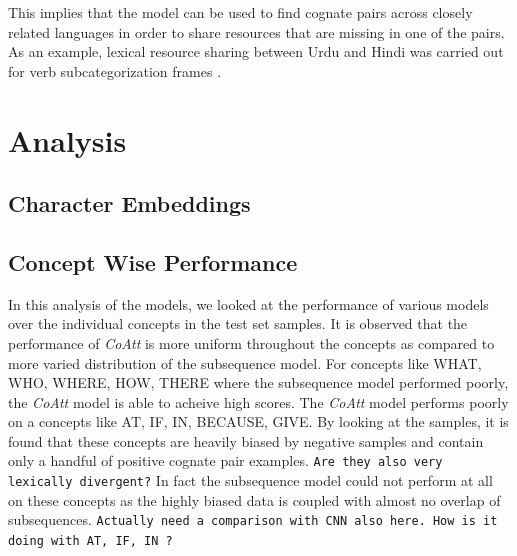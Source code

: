 \documentclass[11pt,letterpaper]{article}
\begin{document}
This implies that the model can be used to find cognate pairs across closely related languages in order to share resources that are missing in one of the pairs. As an example, lexical resource sharing between Urdu and Hindi was carried out for verb subcategorization frames \cite{bhat-EtAl:2014:LT4CloseLang}.

\section{Analysis}

\subsection{Character Embeddings}

\subsection{Concept Wise Performance}

In this analysis of the models, we looked at the performance of various models over the individual concepts in the test set samples. It is observed that the performance of \textit{CoAtt} is more uniform throughout the concepts as compared to more varied distribution of the subsequence model. For concepts like WHAT, WHO, WHERE, HOW, THERE where the subsequence model performed poorly, the \textit{CoAtt} model is able to acheive high scores. The \textit{CoAtt} model performs poorly on a concepts like AT, IF, IN, BECAUSE, GIVE. By looking at the samples, it is found that these concepts are heavily biased by negative samples and contain only a handful of positive cognate pair examples. \texttt{Are they also very lexically divergent?} In fact the subsequence model could not perform at all on these concepts as the highly biased data is coupled with almost no overlap of subsequences. \texttt{Actually need a comparison with CNN also here. How is it doing with AT, IF, IN ? }
\end{document}
